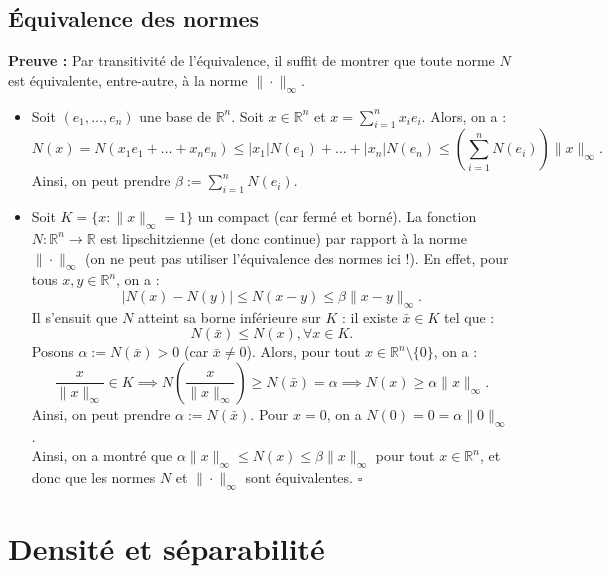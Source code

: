 \documentclass{article}
\begin{document}
\subsection{Équivalence des normes}


\noindent\textbf{Preuve :} Par transitivité de l'équivalence, il suffit de montrer que toute norme $N$ est équivalente, entre-autre, à la norme $\| \cdot \|_\infty$.\\
\begin{itemize}
    \item Soit $(e_1, \ldots, e_n)$ une base de $\mathbb{R}^n$. Soit $x \in \mathbb{R}^n$ et $x = \sum_{i=1}^{n} x_i e_i$. Alors, on a :\\
    $$N(x) = N(x_1 e_1 + \ldots + x_n e_n) \leq |x_1| N(e_1) + \ldots + |x_n| N(e_n) \leq (\sum_{i=1}^{n} N(e_i)) \|x\|_\infty.$$
    Ainsi, on peut prendre $\beta := \sum_{i=1}^{n} N(e_i)$.
    \item Soit $K = \{ x : \|x\|_\infty = 1 \}$ un compact (car fermé et borné). La fonction $N : \mathbb{R}^n \to \mathbb{R}$ est lipschitzienne (et donc continue) par rapport à la norme $\| \cdot \|_\infty$ (on ne peut pas utiliser l'équivalence des normes ici !). En effet, pour tous $x,y \in \mathbb{R}^n$, on a :
    $$|N(x) - N(y)| \leq N(x-y) \leq \beta \|x-y\|_\infty.$$
    Il s'ensuit que $N$ atteint sa borne inférieure sur $K$ : il existe $\bar x \in K$ tel que :
    $$N(\bar x) \leq N(x), \forall x \in K.$$
    Posons $\alpha := N(\bar x) > 0$ (car $\bar x \neq 0$). Alors, pour tout $x \in \mathbb{R}^n \setminus \{0\}$, on a :
    $$\frac{x}{\|x\|_\infty} \in K \implies N\left(\frac{x}{\|x\|_\infty}\right) \geq N(\bar x) = \alpha \implies N(x) \geq \alpha \|x\|_\infty.$$
    Ainsi, on peut prendre $\alpha := N(\bar x)$.
    Pour $x = 0$, on a $N(0) = 0 = \alpha \|0\|_\infty$.\\
    Ainsi, on a montré que $\alpha \|x\|_\infty \leq N(x) \leq \beta \|x\|_\infty$ pour tout $x \in \mathbb{R}^n$, et donc que les normes $N$ et $\| \cdot \|_\infty$ sont équivalentes. \hfill $\square$
\end{itemize}

\section{Densité et séparabilité}
\end{document}
